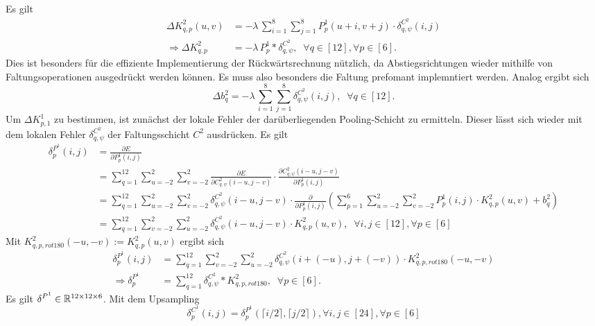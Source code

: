 Es gilt
\begin{align*}
    \Delta K^2_{q,p}(u,v) &= - \lambda \, \sum_{i=1}^8 \sum_{j=1}^8 P^1_{p}(u+i,v+j) \cdot \delta^{C^2}_{q,\psi}(i,j) \\
     \Rightarrow \Delta K_{q,p}^2 &=- \lambda \, P^1_{p} \ast \delta^{C^2}_{q,\psi} , \; \; \forall q \in [12], \forall p \in [6].
\end{align*}
Dies ist besonders für die effiziente Implementierung der Rückwärtsrechnung nützlich, da Abstiegsrichtungen wieder mithilfe von Faltungsoperationen ausgedrückt werden können. Es muss also besonders die Faltung prefomant implemntiert werden. Analog ergibt sich 
\begin{equation*}
    \Delta b_q^2= -\lambda \, \sum_{i=1}^8 \sum_{j=1}^8 \delta_{q,\psi}^{C^2}(i,j), \; \; \forall q \in [12].
\end{equation*}
Um $ \Delta K^1_{p,1}$ zu bestimmen, ist zunächst der lokale Fehler der darüberliegenden Pooling-Schicht zu ermitteln. Dieser lässt sich wieder mit dem lokalen Fehler $\delta_{q,\psi}^{C^2}$ der Faltungsschicht $C^2$ ausdrücken. Es gilt 
\begin{align*}
    \delta^{P^1}_{p}(i,j) &= \frac{\partial E}{\partial P^1_{p}(i,j)} \\
    &= \sum_{q=1}^{12} \sum_{u=-2}^2 \sum_{v=-2}^2 \frac{\partial E}{\partial C^2_{q,\psi}(i-u,j-v)} \cdot \frac{\partial C^2_{q,\psi}(i-u,j-v)}{\partial P_{p}^1(i,j)} \\
    &= \sum_{q=1}^{12} \sum_{u=-2}^2 \sum_{v=-2}^2 \delta^{C^2}_{q,\psi}(i-u,j-v) \cdot \frac{\partial}{\partial P_p^1(i,j)}  \left( \sum_{p=1}^6 \sum_{u=-2}^2 \sum_{v=-2}^2 P^1_p(i,j) \cdot K^2_{q,p}(u,v) +b_q^2\right) \\
    &= \sum_{q=1}^{12} \sum_{v=-2}^2 \sum_{u=-2}^2 \delta_{q,\psi}^{C^2}(i-u,j-v) \cdot K^2_{q,p}(u,v), \; \; \forall i,j \in [12], \forall p \in [6]
\end{align*}
Mit $K^2_{q,p,rot180}(-u,-v):=K^2_{q,p}(u,v)$ ergibt sich
\begin{align*}
    \delta^{P^1}_{p}(i,j)&=\sum_{q=1}^{12} \sum_{v=-2}^2 \sum_{u=-2}^2 \delta_{q,\psi}^{C^2}(i+(-u),j+(-v)) \cdot K^2_{q,p,rot180}(-u,-v) \\
    \Rightarrow \delta^{P^1}_{p} &= \sum_{q=1}^{12} \delta_{q, \psi}^{C^2} \ast K_{q,p,rot180}^2, \; \; \forall p \in [6].
    \end{align*}
Es gilt  $\delta^{P^1} \in \mathbb{R}^{12 \times 12 \times 6}$. Mit dem Upsampling
\begin{equation*}
    \delta^{C^1}_p(i,j)= \delta^{P^1}_p \left( \lceil i/2 \rceil, \lceil j/2 \rceil \right), \forall i,j \in [24], \forall p \in [6]
\end{equation*}
